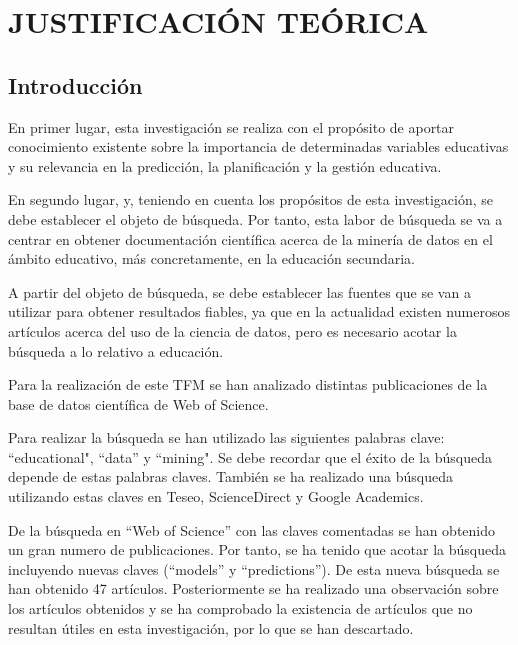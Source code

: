 \section{JUSTIFICACIÓN TEÓRICA}
\subsection{Introducción}
En primer lugar, esta investigación se realiza con el propósito de aportar conocimiento existente sobre la importancia de determinadas variables educativas y su relevancia en la predicción, la planificación y la gestión educativa. 

En segundo lugar, y, teniendo en cuenta los propósitos de esta investigación, se debe establecer el objeto de búsqueda. Por tanto, esta labor de búsqueda se va a centrar en obtener documentación científica acerca de la minería de datos en el ámbito educativo, más concretamente, en la educación secundaria. 

A partir del objeto de búsqueda, se debe establecer las fuentes que se van a utilizar para obtener resultados fiables, ya que en la actualidad existen numerosos artículos acerca del uso de la ciencia de datos, pero es necesario acotar la búsqueda a lo relativo a educación.

Para la realización de este TFM se han analizado distintas publicaciones de la base de datos científica de Web of Science. 

Para realizar la búsqueda se han utilizado las siguientes palabras clave: ``educational", ``data'' y ``mining". Se debe recordar que el éxito de la búsqueda depende de estas palabras claves. También se ha realizado una búsqueda utilizando estas claves en Teseo, ScienceDirect y Google Academics.

De la búsqueda en ``Web of Science'' con las claves comentadas se han obtenido un gran numero de publicaciones. Por tanto, se ha tenido que acotar la búsqueda incluyendo nuevas claves (``models'' y ``predictions''). De esta nueva búsqueda se han obtenido 47 artículos. Posteriormente se ha realizado una observación sobre los artículos obtenidos y se ha comprobado la existencia de artículos que no resultan útiles en esta investigación, por lo que se han descartado.

